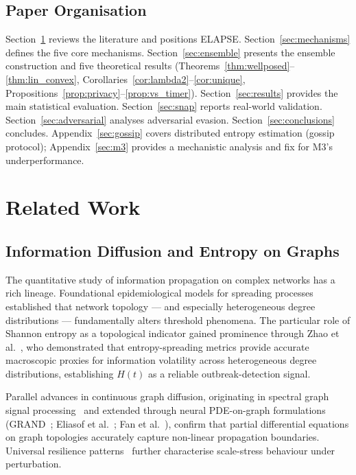 \documentclass[review,12pt]{elsarticle}
\begin{document}
\subsection{Paper Organisation}

Section~\ref{sec:related} reviews the literature and positions ELAPSE.
Section~\ref{sec:mechanisms} defines the five core mechanisms.
Section~\ref{sec:ensemble} presents the ensemble construction and five
theoretical results (Theorems~\ref{thm:wellposed}--\ref{thm:lin_convex},
Corollaries~\ref{cor:lambda2}--\ref{cor:unique},
Propositions~\ref{prop:privacy}--\ref{prop:vs_timer}).
Section~\ref{sec:results} provides the main statistical evaluation.
Section~\ref{sec:snap} reports real-world validation.
Section~\ref{sec:adversarial} analyses adversarial evasion.
Section~\ref{sec:conclusions} concludes.
Appendix~\ref{sec:gossip} covers distributed entropy estimation
(gossip protocol); Appendix~\ref{sec:m3} provides a mechanistic
analysis and fix for M3's underperformance.

\section{Related Work}
\label{sec:related}

\subsection{Information Diffusion and Entropy on Graphs}

The quantitative study of information propagation on complex networks has a
rich lineage. Foundational epidemiological models for spreading
processes~\cite{pastor2015epidemic} established that network topology --- and
especially heterogeneous degree distributions --- fundamentally alters
threshold phenomena. The particular role of Shannon entropy as a topological
indicator gained prominence through Zhao et al.~\cite{zhao2024multi}, who
demonstrated that entropy-spreading metrics provide accurate macroscopic proxies
for information volatility across heterogeneous degree distributions, establishing
$H(t)$ as a reliable outbreak-detection signal.

Parallel advances in continuous graph diffusion, originating in spectral graph
signal processing~\cite{shuman2013emerging} and extended through neural
PDE-on-graph formulations (GRAND~\cite{chamberlain2021grand};
Eliasof et al.~\cite{eliasof2024graph}; Fan et al.~\cite{fan2024graph}), confirm
that partial differential equations on graph topologies accurately capture
non-linear propagation boundaries. Universal resilience patterns~\cite{gao2016universal}
further characterise scale-stress behaviour under perturbation.
\end{document}
